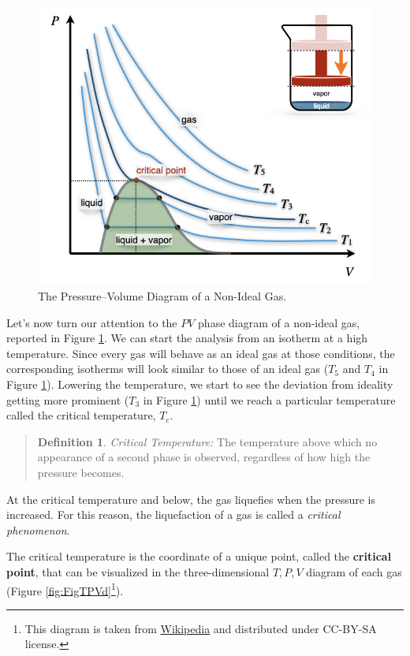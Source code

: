 \documentclass[
  9pt,
]{extbook}
\theoremstyle{definition}
\newtheorem{definition}{Definition}[chapter]
\theoremstyle{definition}
\theoremstyle{definition}
\theoremstyle{definition}
\theoremstyle{remark}
\begin{document}
\begin{figure}

{\centering \includegraphics[width=0.6\linewidth]{./img/OEP_Figures.014} 

}

\caption{The Pressure–Volume Diagram of a Non-Ideal Gas.}\label{fig:FigPVni}
\end{figure}

Let's now turn our attention to the \(PV\) phase diagram of a non-ideal gas, reported in Figure \ref{fig:FigPVni}. We can start the analysis from an isotherm at a high temperature. Since every gas will behave as an ideal gas at those conditions, the corresponding isotherms will look similar to those of an ideal gas (\(T_5\) and \(T_4\) in Figure \ref{fig:FigPVni}). Lowering the temperature, we start to see the deviation from ideality getting more prominent (\(T_3\) in Figure \ref{fig:FigPVni}) until we reach a particular temperature called the critical temperature, \(T_c\).

\begin{quote}
\begin{definition}
\protect\hypertarget{def:criticalT}{}\label{def:criticalT}\emph{Critical Temperature:} The temperature above which no appearance of a second phase is observed, regardless of how high the pressure becomes.
\end{definition}
\end{quote}

At the critical temperature and below, the gas liquefies when the pressure is increased. For this reason, the liquefaction of a gas is called a \emph{critical phenomenon}.

The critical temperature is the coordinate of a unique point, called the \textbf{critical point}, that can be visualized in the three-dimensional \(T,P,V\) diagram of each gas (Figure \ref{fig:FigTPVd}\footnote{This diagram is taken from \href{https://en.wikipedia.org}{Wikipedia} and distributed under CC-BY-SA license.}).
\end{document}
